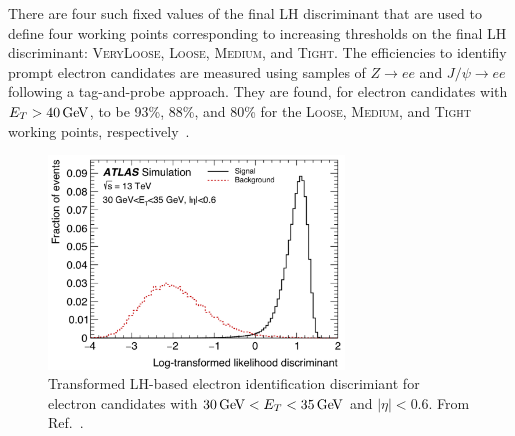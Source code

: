 There are four such fixed values of the final LH discriminant that are used to define
four working points corresponding to increasing thresholds on the final LH discriminant:
\textsc{VeryLoose}, \textsc{Loose}, \textsc{Medium}, and \textsc{Tight}.
The efficiencies to identifiy prompt electron candidates are measured using samples of $Z\rightarrow ee$ and
$J/\psi \rightarrow ee$ following a tag-and-probe approach.
They are found, for electron candidates with $E_T > 40\,\text{Ge\kern -0.1em V}$,
to be 93\%, 88\%, and 80\% for the \textsc{Loose}, \textsc{Medium}, and \textsc{Tight} working points, respectively~\cite{Aad:2019tso}.

\begin{figure}[!htb]
    \begin{center}
    \includegraphics[width=0.7\textwidth]{figures/chapter3/egamma/egamma_lh_discriminant}
    \caption{
        Transformed LH-based electron identification discrimiant for electron candidates
        with $30\,\text{Ge\kern -0.1em V} < E_T < 35\,\text{Ge\kern -0.1em V}$ and $\lvert \eta \rvert < 0.6$.
        From Ref.~\cite{Aad:2019tso}.
    }
    \label{fig:egamma_lh_discriminant}
    \end{center}
\end{figure}


\FloatBarrier

